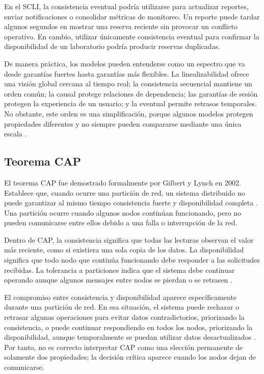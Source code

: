 \documentclass[conference]{IEEEtran}
\begin{document}
En el SCLI, la consistencia eventual podría utilizarse para actualizar reportes, enviar notificaciones o consolidar métricas de monitoreo. Un reporte puede tardar algunos segundos en mostrar una reserva reciente sin provocar un conflicto operativo. En cambio, utilizar únicamente consistencia eventual para confirmar la disponibilidad de un laboratorio podría producir reservas duplicadas.

De manera práctica, los modelos pueden entenderse como un espectro que va desde garantías fuertes hasta garantías más flexibles. La linealizabilidad ofrece una visión global cercana al tiempo real; la consistencia secuencial mantiene un orden común; la causal protege relaciones de dependencia; las garantías de sesión protegen la experiencia de un usuario; y la eventual permite retrasos temporales. No obstante, este orden es una simplificación, porque algunos modelos protegen propiedades diferentes y no siempre pueden compararse mediante una única escala \cite{ref1,ref3}.

\subsection{Teorema CAP}
El teorema CAP fue demostrado formalmente por Gilbert y Lynch en 2002. Establece que, cuando ocurre una partición de red, un sistema distribuido no puede garantizar al mismo tiempo consistencia fuerte y disponibilidad completa \cite{ref9}. Una partición ocurre cuando algunos nodos continúan funcionando, pero no pueden comunicarse entre ellos debido a una falla o interrupción de la red.

Dentro de CAP, la consistencia significa que todas las lecturas observan el valor más reciente, como si existiera una sola copia de los datos. La disponibilidad significa que todo nodo que continúa funcionando debe responder a las solicitudes recibidas. La tolerancia a particiones indica que el sistema debe continuar operando aunque algunos mensajes entre nodos se pierdan o se retrasen \cite{ref9}.

El compromiso entre consistencia y disponibilidad aparece específicamente durante una partición de red. En esa situación, el sistema puede rechazar o retrasar algunas operaciones para evitar datos contradictorios, priorizando la consistencia, o puede continuar respondiendo en todos los nodos, priorizando la disponibilidad, aunque temporalmente se puedan utilizar datos desactualizados \cite{ref9}. Por tanto, no es correcto interpretar CAP como una elección permanente de solamente dos propiedades; la decisión crítica aparece cuando los nodos dejan de comunicarse.
\end{document}
